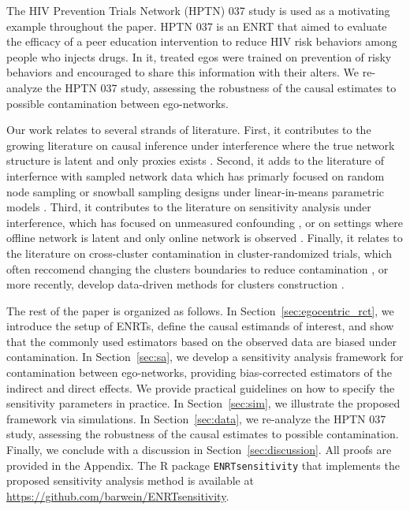 \documentclass[11pt]{article}
\theoremstyle{definition}
\begin{document}
The HIV Prevention Trials Network (HPTN) 037 study \citep{Latkin2009}
is used as a motivating example throughout the paper.
HPTN 037 is an ENRT that aimed to evaluate the efficacy of a peer education intervention
to reduce HIV risk behaviors among people who injects drugs. 
In it, treated egos were trained on prevention of risky behaviors and encouraged to share this information with their alters.
We re-analyze the HPTN 037 study, assessing the robustness of the causal estimates to possible contamination between ego-networks.

Our work relates to several strands of literature.
First, it contributes to the growing literature on causal inference under interference 
where the true network structure is latent and only proxies exists \citep{Toulis2013,Li2021,Hardy2019,boucher2021estimating,weinstein2025}.
Second, it adds to the literature of interfernce with sampled network data 
which has primarly focused on random node sampling or snowball sampling designs 
under linear-in-means parametric models \citep{chandrasekhar2011econometrics, Sewell2017, Yauck2022,marray2024}.
Third, it contributes to the literature on sensitivity analysis under interference,
which has focused on unmeasured confounding \citep{VanderWeele2014},
or on settings where offline network is latent and only online network is observed \citep{Egami2020}.
Finally, it relates to the literature on cross-cluster contamination in cluster-randomized trials,
which often reccomend changing the clusters boundaries to reduce contamination \citep{Hayes2017},
or more recently, develop data-driven methods for clusters construction \citep{leung2025cluster}.

The rest of the paper is organized as follows.
In Section~\ref{sec:egocentric_rct}, we introduce the setup of ENRTs,
    define the causal estimands of interest,
    and show that the commonly used estimators based on the observed data are biased under contamination.
In Section~\ref{sec:sa}, we develop a sensitivity analysis framework for contamination between ego-networks,
    providing bias-corrected estimators of the indirect and direct effects.
  We provide practical guidelines on how to specify the sensitivity parameters in practice.
In Section~\ref{sec:sim}, we illustrate the proposed framework via simulations.
In Section~\ref{sec:data}, we re-analyze the HPTN 037 study,
    assessing the robustness of the causal estimates to possible contamination.
Finally, we conclude with a discussion in Section~\ref{sec:discussion}.  
All proofs are provided in the Appendix.
The R package \texttt{ENRTsensitivity} that implements the proposed sensitivity analysis method 
is available at 
\url{https://github.com/barwein/ENRTsensitivity}.
\end{document}

